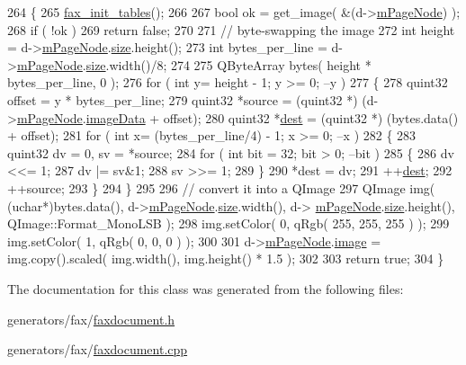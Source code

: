 \begin{DoxyCode}
264 \{
265     \hyperlink{faxexpand_8h_ac37c16fdffc1a2515833c490d6598a07}{fax\_init\_tables}();
266 
267     \textcolor{keywordtype}{bool} ok = get\_image( &(d->\hyperlink{classFaxDocument_1_1Private_a4de794271a866e2252a16b5a3a57cea6}{mPageNode}) );
268     \textcolor{keywordflow}{if} ( !ok )
269         \textcolor{keywordflow}{return} \textcolor{keyword}{false};
270 
271     \textcolor{comment}{// byte-swapping the image}
272     \textcolor{keywordtype}{int} height = d->\hyperlink{classFaxDocument_1_1Private_a4de794271a866e2252a16b5a3a57cea6}{mPageNode}.\hyperlink{classpagenode_a2be79286e9fc2179f6e3f97dc72a56fa}{size}.height();
273     \textcolor{keywordtype}{int} bytes\_per\_line = d->\hyperlink{classFaxDocument_1_1Private_a4de794271a866e2252a16b5a3a57cea6}{mPageNode}.\hyperlink{classpagenode_a2be79286e9fc2179f6e3f97dc72a56fa}{size}.width()/8;
274 
275     QByteArray bytes( height * bytes\_per\_line, 0 );
276     \textcolor{keywordflow}{for} ( \textcolor{keywordtype}{int} y= height - 1; y >= 0; --y )
277     \{
278         quint32 offset  = y * bytes\_per\_line;
279         quint32 *source = (quint32 *) (d->\hyperlink{classFaxDocument_1_1Private_a4de794271a866e2252a16b5a3a57cea6}{mPageNode}.\hyperlink{classpagenode_a879eb55073bbccadfadc524708452fcc}{imageData} + offset);
280         quint32 *\hyperlink{synctex__parser__utils_8c_a723e06ace24a60ed94dca199595c08d2}{dest}   = (quint32 *) (bytes.data() + offset);
281         \textcolor{keywordflow}{for} ( \textcolor{keywordtype}{int} x= (bytes\_per\_line/4) - 1; x >= 0; --x )
282         \{
283             quint32 dv = 0, sv = *source;
284             \textcolor{keywordflow}{for} ( \textcolor{keywordtype}{int} bit = 32; bit > 0; --bit )
285             \{
286                 dv <<= 1;
287                 dv |= sv&1;
288                 sv >>= 1;
289             \}
290             *dest = dv;
291             ++\hyperlink{synctex__parser__utils_8c_a723e06ace24a60ed94dca199595c08d2}{dest};
292             ++source;
293         \}
294     \}
295 
296     \textcolor{comment}{// convert it into a QImage}
297     QImage img( (uchar*)bytes.data(), d->\hyperlink{classFaxDocument_1_1Private_a4de794271a866e2252a16b5a3a57cea6}{mPageNode}.\hyperlink{classpagenode_a2be79286e9fc2179f6e3f97dc72a56fa}{size}.width(), d->
      \hyperlink{classFaxDocument_1_1Private_a4de794271a866e2252a16b5a3a57cea6}{mPageNode}.\hyperlink{classpagenode_a2be79286e9fc2179f6e3f97dc72a56fa}{size}.height(), QImage::Format\_MonoLSB );
298     img.setColor( 0, qRgb( 255, 255, 255 ) );
299     img.setColor( 1, qRgb( 0, 0, 0 ) );
300 
301     d->\hyperlink{classFaxDocument_1_1Private_a4de794271a866e2252a16b5a3a57cea6}{mPageNode}.\hyperlink{classpagenode_a266b69a103ed430ef3a793d134d596d0}{image} = img.copy().scaled( img.width(), img.height() * 1.5 );
302 
303     \textcolor{keywordflow}{return} \textcolor{keyword}{true};
304 \}
\end{DoxyCode}


The documentation for this class was generated from the following files\+:\begin{DoxyCompactItemize}
\item 
generators/fax/\hyperlink{faxdocument_8h}{faxdocument.\+h}\item 
generators/fax/\hyperlink{faxdocument_8cpp}{faxdocument.\+cpp}\end{DoxyCompactItemize}
